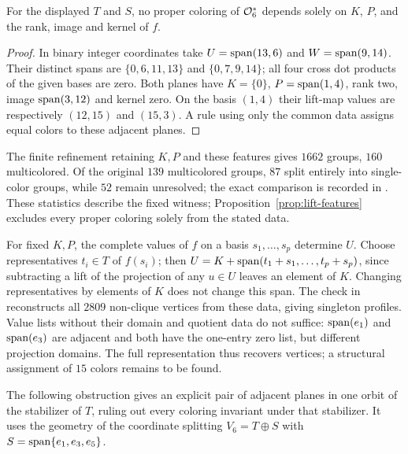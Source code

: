 \begin{proposition}\label{prop:lift-features}
For the displayed \(T\) and \(S\), no proper coloring of \(\mathcal O_6^*\)
depends solely on \(K\), \(P\), and the rank, image and kernel of \(f\).
\end{proposition}
\begin{proof}
In binary integer coordinates take \(U=\operatorname{span}(13,6)\) and
\(W=\operatorname{span}(9,14)\).  Their distinct spans are
\(\{0,6,11,13\}\) and \(\{0,7,9,14\}\); all four cross dot
products of the given bases are zero.  Both planes have
\(K=\{0\}\), \(P=\operatorname{span}(1,4)\), rank two, image \(\operatorname{span}(3,12)\)
and kernel zero.  On the basis \((1,4)\) their lift-map values are
respectively \((12,15)\) and \((15,3)\).  A rule using only the
common data assigns equal colors to these adjacent planes.
\end{proof}

The finite refinement retaining \(K,P\) and these features gives
\(1662\) groups, \(160\) multicolored.  Of the original \(139\)
multicolored groups, \(87\) split entirely into single-color groups,
while \(52\) remain unresolved; the exact comparison is recorded in
.  These statistics describe
the fixed witness; Proposition~\ref{prop:lift-features} excludes every
proper coloring solely from the stated data.

For fixed \(K,P\), the complete values of \(f\) on a basis
\(s_1,\ldots,s_p\) determine \(U\).  Choose representatives
\(t_i\in T\) of \(f(s_i)\); then
\(U=K+\operatorname{span}(t_1+s_1,\ldots,t_p+s_p)\), since subtracting a lift
of the projection of any \(u\in U\) leaves an element of \(K\).
Changing representatives by elements of \(K\) does not change this span.
The check in  reconstructs all
\(2809\) non-clique vertices from these data, giving singleton profiles.
Value lists without their domain and quotient data do not suffice:
\(\operatorname{span}(e_1)\) and \(\operatorname{span}(e_3)\) are adjacent and both have the
one-entry zero list, but different projection domains.
The full representation thus recovers vertices; a structural assignment
of \(15\) colors remains to be found.

The following obstruction gives an explicit pair of adjacent planes
in one orbit of the stabilizer of \(T\), ruling out every coloring
invariant under that stabilizer. It uses the geometry of the coordinate
splitting \(V_6=T\oplus S\) with \(S=\operatorname{span}\{e_1,e_3,e_5\}\).

